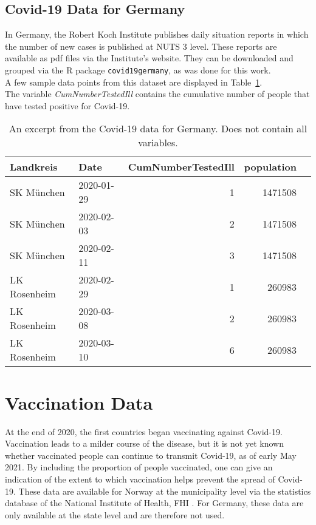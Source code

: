 \subsection{Covid-19 Data for Germany}
In Germany, the Robert Koch Institute publishes daily situation reports in which the number of new cases is published at NUTS 3 level. These reports are available as pdf files via the Institute's website. They can be downloaded and grouped via the R package \texttt{covid19germany}\autocite[][]{covid19germany}, as was done for this work.\\
A few sample data points from this dataset are displayed in Table~\ref{datasetGermany}.\\
The variable \textit{CumNumberTestedIll} contains the cumulative number of people that have tested positive for Covid-19.
\begin{table}[H] 
\caption{An excerpt from the Covid-19 data for Germany. Does not contain all variables.\label{datasetGermany}}
\begin{tabular}{l l r r r}
\toprule
\textbf{Landkreis}	& \textbf{Date}	& \textbf{CumNumberTestedIll} & \textbf{population}\\
\midrule
SK München & 2020-01-29 & 1 & 1471508\\
SK München & 2020-02-03 & 2 & 1471508\\
SK München & 2020-02-11 & 3 & 1471508\\
LK Rosenheim & 2020-02-29 & 1 & 260983\\
LK Rosenheim & 2020-03-08 & 2 & 260983 \\
LK Rosenheim & 2020-03-10 & 6 & 260983 \\
\bottomrule
\end{tabular}
\end{table}
\clearpage
\section{Vaccination Data}
At the end of 2020, the first countries began vaccinating against Covid-19. Vaccination leads to a milder course of the disease, but it is not yet known whether vaccinated people can continue to transmit Covid-19, as of early May 2021. By including the proportion of people vaccinated, one can give an indication of the extent to which vaccination helps prevent the spread of Covid-19. These data are available for Norway at the municipality level via the statistics database of the National Institute of Health, FHI \autocite[][]{fhi}. For Germany, these data are only available at the state level and are therefore not used.
\clearpage
